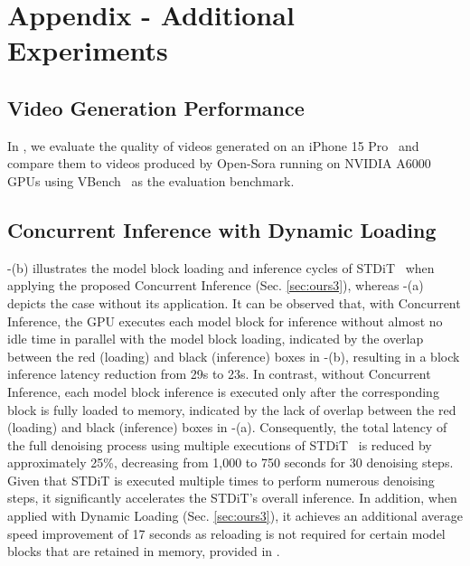\section{Appendix - Additional Experiments}
\label{sec:extra_experiment}

\subsection{Video Generation Performance}

{In , we evaluate the quality of videos generated on an iPhone 15 Pro~\cite{apple2023} and compare them to videos produced by Open-Sora running on NVIDIA A6000 GPUs using VBench~\cite{huang2024vbench} as the evaluation benchmark. 


\subsection{Concurrent Inference with Dynamic Loading}

% 
\label{sec:CIDL}

-(b) illustrates the model block loading and inference cycles of STDiT~\cite{opensora} when applying the proposed Concurrent Inference (Sec. \ref{sec:ours3}), whereas -(a) depicts the case without its application. It can be observed that, with Concurrent Inference, the GPU executes each model block for inference without almost no idle time in parallel with the model block loading, indicated by the overlap between the red (loading) and black (inference) boxes in -(b), resulting in a block inference latency reduction from 29s to 23s. In contrast, without Concurrent Inference, each model block inference is executed only after the corresponding block is fully loaded to memory, indicated by the lack of overlap between the red (loading) and black (inference) boxes in -(a). Consequently, the total latency of the full denoising process using multiple executions of STDiT~\cite{opensora} is reduced by approximately 25\%, decreasing from 1,000 to 750 seconds for 30 denoising steps. Given that STDiT is executed multiple times to perform numerous denoising steps, it significantly accelerates the STDiT's overall inference. In addition, when applied with Dynamic Loading (Sec. \ref{sec:ours3}), it achieves an additional average speed improvement of 17 seconds as reloading is not required for certain model blocks that are retained in memory, provided in .

}
